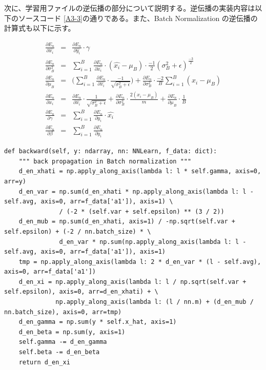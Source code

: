 \documentclass[a4paper,dvipdfmx]{jsarticle}
\begin{document}
次に、学習用ファイルの逆伝播の部分について説明する。逆伝播の実装内容は以下のソースコード \ref{A3-3}の通りである。また、Batch Normalization の逆伝播の計算式も以下に示す。

\begin{eqnarray}
\label{bn2-1}
	\frac{\partial E_n}{\partial \hat{x_i}} & = & \frac{\partial E_n}{\partial \hat{y_i}} \cdot \gamma \\
\label{bn2-2}
	\frac{\partial E_n}{\partial \sigma_B^2} & = & \sum_{i=1}^{B}{\frac{\partial E_n}{\partial \hat{x_i}}} \cdot (\hat{x_i} - \mu_B) \cdot \frac{-1}{2}(\sigma_B^2 + \epsilon)^{\frac{-3}{2}} \\
\label{bn2-3}
	\frac{\partial E_n}{\partial \mu_B} & = & (\sum_{i=1}^{B}{\frac{\partial E_n}{\partial \hat{x_i}} 
	\cdot \frac{-1}{\sqrt{\sigma_B^2 + \epsilon}}) + \frac{\partial E_n}{\partial \sigma_B^2}} \cdot \frac{-2}{B} \sum_{i=1}^{B}{(x_i - \mu_B)} \\
\label{bn2-4}
	\frac{\partial E_n}{\partial x_i} & = & \frac{\partial E_n}{\partial \hat{x_i}} \cdot \frac{1}{\sqrt{\sigma_B^2 + \epsilon}} + \frac{\partial E_n}{\partial \sigma_B^2} \cdot \frac{2(x_i -\mu_B)}{m} + \frac{\partial E_n}{\partial \mu_B} \cdot \frac{1}{B} \\
\label{bn2-5}
	\frac{\partial E_n}{\partial \gamma} & = & \sum_{i=1}^{B}{\frac{\partial E_n}{\partial y_i} \cdot \hat{x_i}} \\
\label{bn2-6}
	\frac{\partial E_n}{\partial \beta} & = & \sum_{i=1}^{B}{\frac{\partial E_n}{\partial y_i}}
\end{eqnarray}

\begin{lstlisting}[caption="Batch Normalization (学習用: 逆伝播)",label=A3-3]
def backward(self, y: ndarray, nn: NNLearn, f_data: dict):
    """ back propagation in Batch normalization """
    d_en_xhati = np.apply_along_axis(lambda l: l * self.gamma, axis=0, arr=y)
    d_en_var = np.sum(d_en_xhati * np.apply_along_axis(lambda l: l - self.avg, axis=0, arr=f_data['a1']), axis=1) \
               / (-2 * (self.var + self.epsilon) ** (3 / 2))
    d_en_mub = np.sum(d_en_xhati, axis=1) / -np.sqrt(self.var + self.epsilon) + (-2 / nn.batch_size) * \
               d_en_var * np.sum(np.apply_along_axis(lambda l: l - self.avg, axis=0, arr=f_data['a1']), axis=1)
    tmp = np.apply_along_axis(lambda l: 2 * d_en_var * (l - self.avg), axis=0, arr=f_data['a1'])
    d_en_xi = np.apply_along_axis(lambda l: l / np.sqrt(self.var + self.epsilon), axis=0, arr=d_en_xhati) + \
              np.apply_along_axis(lambda l: (l / nn.m) + (d_en_mub / nn.batch_size), axis=0, arr=tmp)
    d_en_gamma = np.sum(y * self.x_hat, axis=1)
    d_en_beta = np.sum(y, axis=1)
    self.gamma -= d_en_gamma
    self.beta -= d_en_beta
    return d_en_xi
\end{lstlisting}
\end{document}
